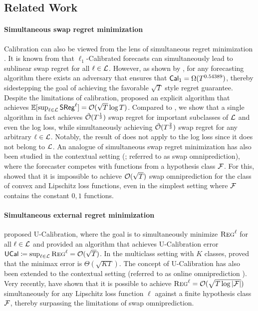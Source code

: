 \subsection{Related Work}

\paragraph{Simultaneous swap regret minimization} Calibration can also be viewed from the lens of simultaneous regret minimization \citep{kleinberg2023u, roth2024forecasting, hu2024predict, luo2024optimal}. It is known from \cite{kleinberg2023u} that
$\ell_{1}$-Calibrated forecasts can simultaneously lead to sublinear swap regret for all $\ell \in \cL$. However, as shown by \cite{qiao2021stronger, dagan2024improved}, for any forecasting algorithm there exists an adversary that ensures that $\cal_{1} = \Omega(T^{0.54389})$, thereby sidestepping the goal of achieving the favorable $\sqrt{T}$ style regret guarantee. Despite the limitations of calibration, \cite{hu2024predict} proposed an explicit algorithm that achieves $\mathbb{E}[\sup_{\ell \in \cL}\sreg^{\ell}] = \cO(\sqrt{T} \log T)$.  
Compared to \cite{hu2024predict}, we show that a single algorithm in fact achieves $\tilde{\cO}(T^{\frac{1}{3}})$ swap regret for important subclasses of $\cL$ and even the log loss, while simultaneously achieving $\tilde{\cO}(T^{\frac{2}{3}})$ swap regret for any arbitrary $\ell \in \cL$. Notably, the result of \cite{hu2024predict} does not apply to the log loss since it does not belong to $\cL$. An analogue of simultaneous swap regret minimization has also been studied in the contextual setting (\citealp{garg2024oracle}; referred to as swap omniprediction), where the forecaster competes with functions from a hypothesis class $\cF$. 
For this, \cite{garg2024oracle} showed that it is impossible to achieve $\cO(\sqrt{T})$ swap omniprediction for the class of convex and Lipschitz loss functions, even in the simplest setting where $\cF$ contains the constant $0, 1$ functions. 

\paragraph{Simultaneous external regret minimization} \cite{kleinberg2023u} proposed U-Calibration, where the goal is to simultaneously minimize $\textsc{Reg}^{\ell}$ for all $\ell \in \cL$ and provided an algorithm that achieves U-Calibration error $\ucal \coloneqq \sup_{\ell \in \cL} \textsc{Reg}^{\ell} = {\cO}(\sqrt{T})$. 
In the multiclass setting with $K$ classes, \cite{luo2024optimal} proved that the minimax error is $\Theta(\sqrt{KT})$. 
The concept of U-Calibration has also been extended to the contextual setting (referred to as online omniprediction \citep{garg2024oracle}). Very recently, \cite{okoroafor2025near} have shown that it is possible to achieve $\textsc{Reg}^{\ell} = \cO(\sqrt{T \log \abs{\cF}})$ simultaneously for any Lipschitz loss function $\ell$ against a finite hypothesis class $\cF$, thereby surpassing the limitations of swap omniprediction.  

